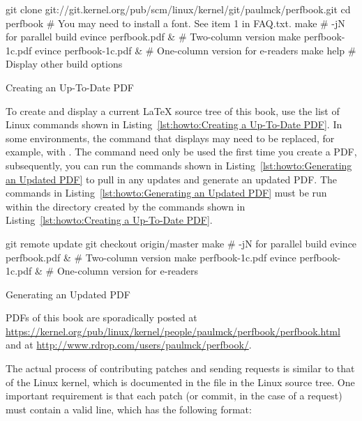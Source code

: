 \begin{listing}[tbp]
\begin{VerbatimL}[breaklines=true,breakafter=/,
        breakaftersymbolpre=\raisebox{-.7ex}{\textcolor{darkgray}{\Pisymbol{psy}{191}}},
	breaksymbolleft=\textcolor{darkgray}{\tiny\ensuremath{\hookrightarrow}},
        numbers=none,xleftmargin=0pt]
git clone git://git.kernel.org/pub/scm/linux/kernel/git/paulmck/perfbook.git
cd perfbook
# You may need to install a font. See item 1 in FAQ.txt.
make                     # -jN for parallel build
evince perfbook.pdf &    # Two-column version
make perfbook-1c.pdf
evince perfbook-1c.pdf & # One-column version for e-readers
make help                # Display other build options
\end{VerbatimL}
\caption{Creating an Up-To-Date PDF}
\label{lst:howto:Creating a Up-To-Date PDF}
\end{listing}

To create and display a current \LaTeX{} source tree of this book,
use the list of Linux commands shown in
Listing~\ref{lst:howto:Creating a Up-To-Date PDF}.
In some environments, the  command that displays 
may need to be replaced, for example, with .
The  command need only be used the first time you
create a PDF, subsequently, you can run the commands shown in
Listing~\ref{lst:howto:Generating an Updated PDF} to pull in any updates
and generate an updated PDF\@.
The commands in
Listing~\ref{lst:howto:Generating an Updated PDF}
must be run within the  directory created by the commands
shown in
Listing~\ref{lst:howto:Creating a Up-To-Date PDF}.

\begin{listing}[tbp]
\begin{VerbatimL}[numbers=none,xleftmargin=0pt]
git remote update
git checkout origin/master
make                     # -jN for parallel build
evince perfbook.pdf &    # Two-column version
make perfbook-1c.pdf
evince perfbook-1c.pdf & # One-column version for e-readers
\end{VerbatimL}
\caption{Generating an Updated PDF}
\label{lst:howto:Generating an Updated PDF}
\end{listing}

PDFs of this book are sporadically posted at
\url{https://kernel.org/pub/linux/kernel/people/paulmck/perfbook/perfbook.html}
and at
\url{http://www.rdrop.com/users/paulmck/perfbook/}.

The actual process of contributing patches and sending 
requests is similar to that of the Linux kernel, which is documented
in the  file in the Linux source tree.
One important requirement is that each patch (or commit, in the case
of a  request) must contain a valid  line,
which has the following format:

